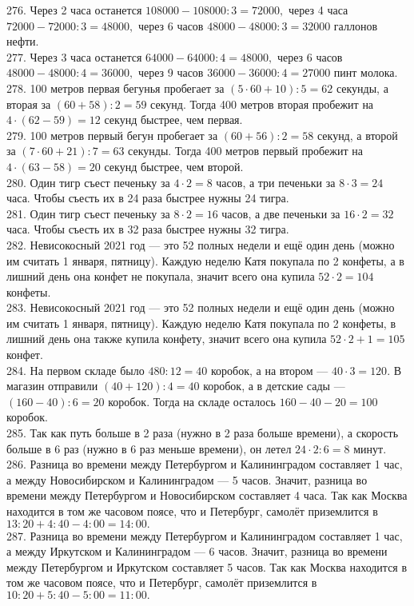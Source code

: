 276. Через 2 часа останется $108000-108000:3=72000,$ через 4 часа $72000-72000:3=48000,$ через 6 часов $48000-48000:3=32000$ галлонов нефти.\\
277. Через 3 часа останется $64000-64000:4=48000,$ через 6 часов $48000-48000:4=36000,$ через 9 часов $36000-36000:4=27000$ пинт молока.\\
278. 100 метров первая бегунья пробегает за $(5\cdot60+10):5=62$ секунды, а вторая за $(60+58):2=59$ секунд. Тогда 400 метров вторая пробежит на $4\cdot(62-59)=12$ секунд быстрее, чем первая.\\
279. 100 метров первый бегун пробегает за $(60+56):2=58$ секунд, а второй за $(7\cdot60+21):7=63$ секунды. Тогда 400 метров первый пробежит на $4\cdot(63-58)=20$ секунд быстрее, чем второй.\\
280. Один тигр съест печеньку за $4\cdot2=8$ часов, а три печеньки за $8\cdot3=24$ часа. Чтобы съесть их в 24 раза быстрее нужны 24 тигра.\\
281. Один тигр съест печеньку за $8\cdot2=16$ часов, а две печеньки за $16\cdot2=32$ часа. Чтобы съесть их в 32 раза быстрее нужны 32 тигра.\\
282. Невисокосный 2021 год --- это 52 полных недели и ещё один день (можно им считать 1 января, пятницу). Каждую неделю Катя покупала по 2 конфеты, а в лишний день она конфет не покупала, значит всего она купила $52\cdot2=104$ конфеты.\\
283. Невисокосный 2021 год --- это 52 полных недели и ещё один день (можно им считать 1 января, пятницу). Каждую неделю Катя покупала по 2 конфеты, в лишний день она также купила конфету, значит всего она купила $52\cdot2+1=105$ конфет.\\
284. На первом складе было $480:12=40$ коробок, а на втором --- $40\cdot3=120.$ В магазин отправили $(40+120):4=40$ коробок, а в детские сады --- $(160-40):6=20$ коробок. Тогда на складе осталось $160-40-20=100$ коробок.\\
285. Так как путь больше в 2 раза (нужно в 2 раза больше времени), а скорость больше в 6 раз (нужно в 6 раз меньше времени), он летел $24\cdot2:6=8$ минут.\\
286. Разница во времени между Петербургом и Калининградом составляет 1 час, а между Новосибирском и Калининградом --- 5 часов. Значит, разница во времени между Петербургом и Новосибирском составляет 4 часа. Так как Москва находится в том же часовом поясе, что и Петербург, самолёт приземлится в $13:20+4:40-4:00=14:00.$\\
287. Разница во времени между Петербургом и Калининградом составляет 1 час, а между Иркутском и Калининградом --- 6 часов. Значит, разница во времени между Петербургом и Иркутском составляет 5 часов. Так как Москва находится в том же часовом поясе, что и Петербург, самолёт приземлится в $10:20+5:40-5:00=11:00.$\\
